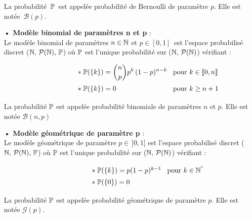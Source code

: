 \noindent La probabilité \(\,\mathbb{P}\,\) est appelée probabilité de Bernoulli de paramètre $p$. Elle est notée \(\,\mathcal{B}(p)\).


\vspace{0.9cm}

\textbf{• Modèle binomial de paramètres n et p} :\vspace{0.2cm}\\
Le modèle binomial de paramètres \(n\in \mathbb{N}\) et \(p\in [0,1]\,\) est l'espace probabilisé discret (\(\mathbb{N},\,\mathcal{P}(\mathbb{N}),\,\mathbb{P}\)) où \(\mathbb{P}\) est l'unique probabilité sur (\(\mathbb{N},\,\mathcal{P}(\mathbb{N})\)) vérifiant :\vspace{-0.1cm}

\[\displaystyle \hspace{2cm} \def\arraystretch{1.4} \arraycolsep=0.15cm
\begin{array}{ll}
    \ast \; \PP(\{k\})=\displaystyle{\binom{n}{p}p^k\,(1-p)^{n-k}} & \text{pour } k\in \llbracket 0,n \rrbracket \vspace{0.1cm}\\
    \ast \; \PP(\{k\})=0 & \text{pour } k\geq n+1 
\end{array}\]

\vspace{0.3cm}

\noindent La probabilité \(\mathbb{P}\) est appelée probabilité binomiale de paramètres $n$ et $p$. Elle est notée \(\mathcal{B}(n,p)\)

\vspace{0.9cm}

\textbf{• Modèle géométrique de paramètre p} :\vspace{0.2cm}\\
Le modèle géométrique de paramètre \(p\in\, ]0,1]\) est l'espace probabilisé discret (\(\mathbb{N},\,\mathcal{P}(\mathbb{N}),\,\mathbb{P}\)) où \(\mathbb{P}\) est l'unique probabilité sur (\(\mathbb{N},\,\mathcal{P}(\mathbb{N})\)) vérifiant :\vspace{-0.3cm}

\[ \hspace{2cm} \def\arraystretch{1.4} \arraycolsep=0.15cm
\begin{array}{ll}
    \ast \; \PP(\{k\})=p(1-p)^{k-1} & \text{pour } k\in \NN^{^*}\\
    \ast \; \PP(\{0\})=0 & 
\end{array}\]

\vspace{0.2cm}

\noindent La probabilité \(\mathbb{P}\) est appelée probabilité géométrique de paramètre $p$. Elle est notée \(\mathcal{G}(p)\).

